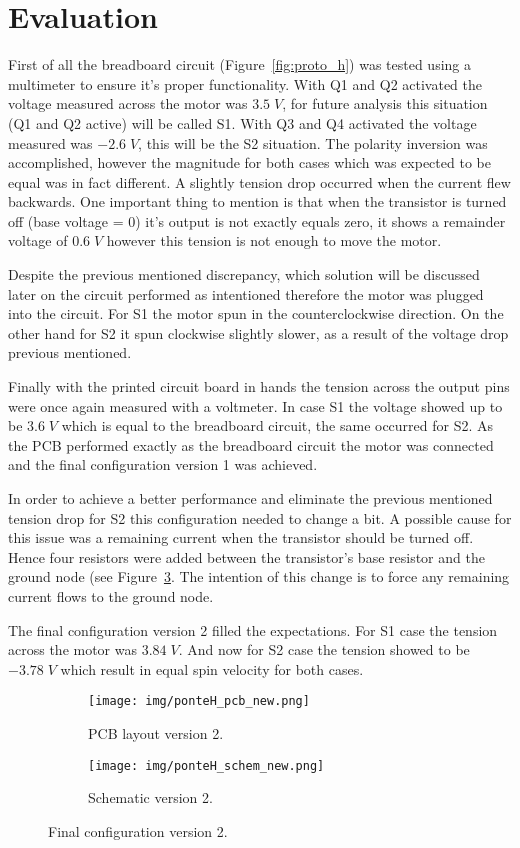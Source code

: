 \section{\textbf{Evaluation}}\label{sec:5}

	First of all the breadboard circuit (Figure~\ref{fig:proto_h}) was tested using a multimeter to ensure it's proper functionality. With Q1 and Q2 activated the voltage measured across the motor was $3.5\;V$, for future analysis this situation (Q1 and Q2 active) will be called S1. With Q3 and Q4 activated the voltage measured was $-2.6\;V$, this will be the S2 situation. The polarity inversion was accomplished, however the magnitude for both cases which was expected to be equal was in fact different. A slightly tension drop occurred when the current flew backwards. One important thing to mention is that when the transistor is turned off (base voltage = 0) it's output is not exactly equals zero, it shows a remainder voltage of $0.6\;V$ however this tension is not enough to move the motor.
	
	Despite the previous mentioned discrepancy, which solution will be discussed later on the circuit performed as intentioned therefore the motor was plugged into the circuit. For S1 the motor spun in the counterclockwise direction. On the other hand for S2 it spun clockwise slightly slower, as a result of the voltage drop previous mentioned.
	
	Finally with the printed circuit board in hands the tension across the output pins were once again measured with a voltmeter. In case S1 the voltage showed up to be $3.6\;V$ which is equal to the breadboard circuit, the same occurred for S2. As the PCB performed exactly as the breadboard circuit the motor was connected and the final configuration version 1 was achieved.
	
	In order to achieve a better performance and eliminate the previous mentioned tension drop for S2 this configuration needed to change a bit. A possible cause for this issue was a remaining current when the transistor should be turned off. Hence four resistors were added between the transistor's base resistor and the ground node (see Figure~\ref{fig:h_schem_v2}. The intention of this change is to force any remaining current flows to the ground node.
	
	The final configuration version 2 filled the expectations. For S1 case the tension across the motor was $3.84\;V$. And now for S2 case the tension showed to be $-3.78\;V$ which result in equal spin velocity for both cases.
	
\begin{figure}
\centering
\begin{subfigure}{\columnwidth}
\centering%
\texttt{[image: img/ponteH\_pcb\_new.png]}
\caption{PCB layout version 2.}
\label{fig:new_layout}%
\end{subfigure}

\begin{subfigure}{\columnwidth}
\centering%
\texttt{[image: img/ponteH\_schem\_new.png]}
\caption{Schematic version 2.}
\label{fig:new_schem}%
\end{subfigure}
\label{fig:h_schem_v2}
\caption{Final configuration version 2.}
\end{figure}
